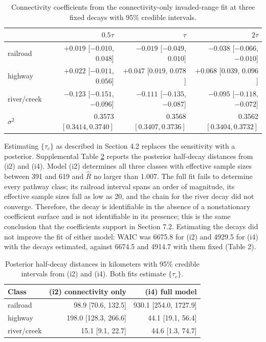 \documentclass{article}
\begin{document}
\begin{table}[h]
\caption{Connectivity coefficients from the connectivity-only invaded-range fit at three fixed decays with 95\% credible intervals.}
\begin{tabular}{l|rrr}
\label{tab:g3}
 & $0.5\tau$ & $\tau$ & $2\tau$ \\ \hline
railroad    & $+0.019$ [$-0.010$, $0.048$] & $-0.019$ [$-0.049$, $0.010$] & $-0.038$ [$-0.066$, $-0.010$] \\
highway     & $+0.022$ [$-0.011$, $0.056$] & $+0.047$ [$0.019$, $0.078$]  & $+0.068$ [$0.039$, $0.096$] \\
river/creek & $-0.123$ [$-0.151$, $-0.096$] & $-0.111$ [$-0.135$, $-0.087$] & $-0.095$ [$-0.118$, $-0.072$] \\
$\sigma^2$  & 0.3573 $[0.3414, 0.3740]$ & 0.3568 $[0.3407, 0.3736]$ & 0.3562 $[0.3404, 0.3732]$
\end{tabular}
\end{table}
 
Estimating $\{\tau_c\}$ as described in Section 4.2 replaces the sensitivity with a posterior. Supplemental Table \ref{tab:g4} reports the posterior half-decay distances from (i2) and (i4). Model (i2) determines all three classes with effective sample sizes between 391 and 619 and $\hat{R}$ no larger than 1.007. The full fit fails to determine every pathway class; its railroad interval spans an order of magnitude, its effective sample sizes fall as low as 20, and the chain for the river decay did not converge. Therefore, the decay is identifiable in the absence of a nonstationary coefficient surface and is not identifiable in its presence; this is the same conclusion that the coefficients support in Section 7.2. Estimating the decays did not improve the fit of either model: WAIC was 6675.8 for (i2) and 4929.5 for (i4) with the decays estimated, against 6674.5 and 4914.7 with them fixed (Table 2).
 
\begin{table}[h]
\caption{Posterior half-decay distances in kilometers with 95\% credible intervals from (i2) and (i4). Both fits estimate $\{\tau_c\}$.}
\begin{tabular}{l|rr}
\label{tab:g4}
Class & (i2) connectivity only & (i4) full model \\ \hline
railroad    & 98.9 [70.6, 132.5]    & 930.1 [254.0, 1727.9] \\
highway     & 198.0 [128.3, 266.6]  & 44.1 [19.1, 56.4] \\
river/creek & 15.1 [9.1, 22.7]      & 44.6 [1.3, 74.7]
\end{tabular}
\end{table}
 
\end{document}
